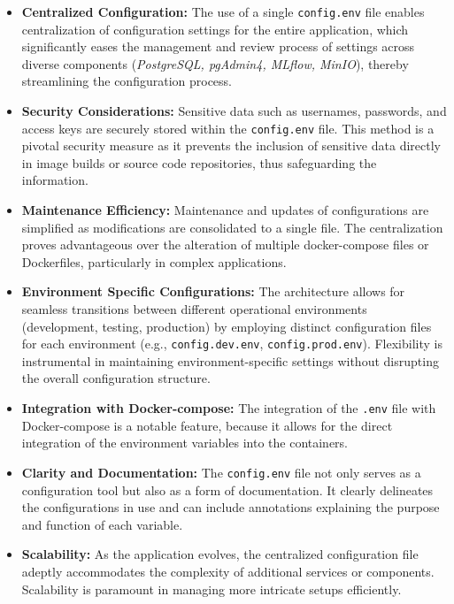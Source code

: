 \begin{itemize}
    \item \textbf{Centralized Configuration:} The use of a single \texttt{config.env} file enables centralization of configuration settings for the entire application, which significantly eases the management and review process of settings across diverse components (\textit{PostgreSQL, pgAdmin4, MLflow, MinIO}), thereby streamlining the configuration process.
    \item \textbf{Security Considerations:} Sensitive data such as usernames, passwords, and access keys are securely stored within the \texttt{config.env} file. This method is a pivotal security measure as it prevents the inclusion of sensitive data directly in image builds or source code repositories, thus safeguarding the information.
    \item \textbf{Maintenance Efficiency: } Maintenance and updates of configurations are simplified as modifications are consolidated to a single file. The centralization proves advantageous over the alteration of multiple docker-compose files or Dockerfiles, particularly in complex applications.
    \item \textbf{Environment Specific Configurations: } The architecture allows for seamless transitions between different operational environments (development, testing, production) by employing distinct configuration files for each environment (e.g., \texttt{config.dev.env}, \texttt{config.prod.env}). Flexibility is instrumental in maintaining environment-specific settings without disrupting the overall configuration structure.
    \item \textbf{Integration with Docker-compose:} The integration of the \texttt{.env} file with Docker-compose is a notable feature, because it allows for the direct integration of the environment variables into the containers.
    \item \textbf{Clarity and Documentation:} The \texttt{config.env} file not only serves as a configuration tool but also as a form of documentation. It clearly delineates the configurations in use and can include annotations explaining the purpose and function of each variable.
    \item \textbf{Scalability:} As the application evolves, the centralized configuration file adeptly accommodates the complexity of additional services or components. Scalability is paramount in managing more intricate setups efficiently.    
\end{itemize}

